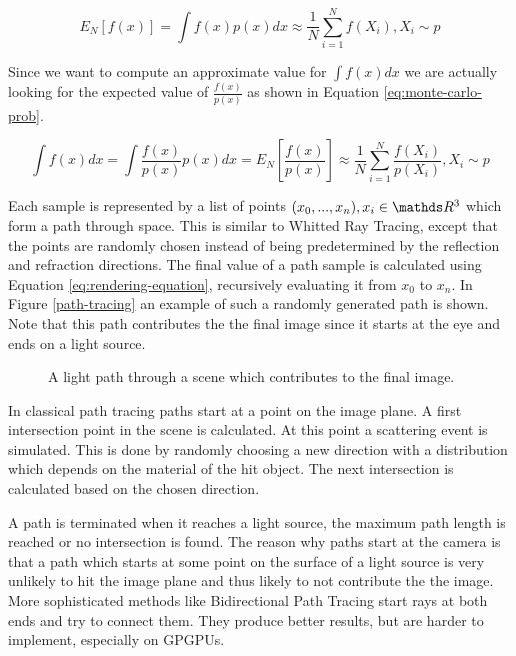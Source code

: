 \documentclass{ACGSeminar}
\begin{document}
\begin{equation}\label{eq:monte-carlo}
E_N[f(x)] = \int{f(x)p(x)dx} \approx \frac{1}{N} \sum_{i=1}^{N}{ f(X_i) }   , X_i \sim p 
\end{equation}

Since we want to compute an approximate value for $\int{f(x)dx}$ we are actually looking for the expected value of $\frac{f(x)}{p(x)}$ as shown in Equation \eqref{eq:monte-carlo-prob}.

\begin{equation}\label{eq:monte-carlo-prob}
\int{f(x)dx} = \int{\frac{f(x)}{p(x)}p(x)dx} = E_N[\frac{f(x)}{p(x)}] \approx \frac{1}{N} \sum_{i=1}^{N}{ \frac{f(X_i)}{p(X_i)} }   , X_i \sim p 
\end{equation}

Each sample is represented by a list of points $(x_0, ..., x_n), x_i \in \R^3$ which form a path through space. This is similar to Whitted Ray Tracing, except that the points are randomly chosen instead of being predetermined by the reflection and refraction directions. The final value of a path sample is calculated using Equation \eqref{eq:rendering-equation}, recursively evaluating it from $x_0$ to $x_n$. 
In Figure \ref{path-tracing} an example of such a randomly generated path is shown. Note that this path contributes the the final image since it starts at the eye and ends on a light source.

\begin{figure}[htb!]
  \centering
  
  \caption{A light path through a scene which contributes to the final image.}
  \label{fig:light-path}
\end{figure}

In classical path tracing paths start at a point on the image plane. A first intersection point in the scene is calculated. At this point a scattering event is simulated. This is done by randomly choosing a new direction with a distribution which depends on the material of the hit object. The next intersection is calculated based on the chosen direction.

A path is terminated when it reaches a light source, the maximum path length is reached or no intersection is found.
The reason why paths start at the camera is that a path which starts at some point on the surface of a light source is very unlikely to hit the image plane and thus likely to not contribute the the image. More sophisticated methods like Bidirectional Path Tracing start rays at both ends and try to connect them. They produce better results, but are harder to implement, especially on GPGPUs.
\end{document}
